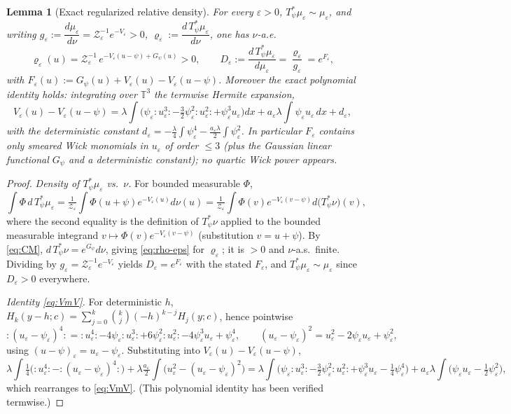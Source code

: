 \documentclass[12pt]{article}
\newcommand{\bT}{\mathbb{T}}
\newcommand{\Wick}[1]{{:}#1{:}}
\newcommand{\eps}{\varepsilon}
\theoremstyle{plain}
\newtheorem{lemma}{Lemma}
\theoremstyle{definition}
\begin{document}
\begin{lemma}[Exact regularized relative density]\label{lem:auto}
For every $\eps>0$, $T_\psi^\ast\mu_\eps\sim\mu_\eps$, and writing
$g_\eps:=\dfrac{d\mu_\eps}{d\nu}=\mathcal Z_\eps^{-1}e^{-V_\eps}>0$,
$\varrho_\eps:=\dfrac{d\,T_\psi^\ast\mu_\eps}{d\nu}$, one has $\nu$-a.e.
\begin{equation}\label{eq:rho-eps}
\varrho_\eps(u)=\mathcal Z_\eps^{-1}\,e^{-V_\eps(u-\psi)+G_\psi(u)}>0,
\qquad
D_\eps:=\frac{d\,T_\psi^\ast\mu_\eps}{d\mu_\eps}=\frac{\varrho_\eps}{g_\eps}
=e^{F_\eps},
\end{equation}
with $F_\eps(u):=G_\psi(u)+V_\eps(u)-V_\eps(u-\psi)$. Moreover the exact polynomial
identity holds: integrating over $\bT^3$ the termwise Hermite expansion,
\begin{equation}\label{eq:VmV}
V_\eps(u)-V_\eps(u-\psi)
=\lambda\!\int\!\Big(\psi_\eps\Wick{u_\eps^3}-\tfrac32\psi_\eps^2\Wick{u_\eps^2}+\psi_\eps^3u_\eps\Big)dx
+a_\eps\lambda\!\int\psi_\eps u_\eps\,dx+d_\eps,
\end{equation}
with the deterministic constant $d_\eps=-\tfrac\lambda4\int\psi_\eps^4-\tfrac{a_\eps\lambda}2\int\psi_\eps^2$.
In particular $F_\eps$ contains only smeared Wick monomials in $u_\eps$ of order $\le3$
(plus the Gaussian linear functional $G_\psi$ and a deterministic constant); no quartic
Wick power appears.
\end{lemma}

\begin{proof}
\emph{Density of $T_\psi^\ast\mu_\eps$ vs.\ $\nu$.} For bounded measurable $\Phi$,
\[
\int\Phi\,d\,T_\psi^\ast\mu_\eps
=\tfrac1{\mathcal Z_\eps}\!\int\Phi(u+\psi)e^{-V_\eps(u)}d\nu(u)
=\tfrac1{\mathcal Z_\eps}\!\int\Phi(v)e^{-V_\eps(v-\psi)}d\big(T_\psi^\ast\nu\big)(v),
\]
where the second equality is the definition of $T_\psi^\ast\nu$ applied to the bounded
measurable integrand $v\mapsto\Phi(v)e^{-V_\eps(v-\psi)}$ (substitution $v=u+\psi$). By
\eqref{eq:CM}, $d\,T_\psi^\ast\nu=e^{G_\psi}d\nu$, giving \eqref{eq:rho-eps} for
$\varrho_\eps$; it is $>0$ and $\nu$-a.s.\ finite. Dividing by
$g_\eps=\mathcal Z_\eps^{-1}e^{-V_\eps}$ yields $D_\eps=e^{F_\eps}$ with the stated
$F_\eps$, and $T_\psi^\ast\mu_\eps\sim\mu_\eps$ since $D_\eps>0$ everywhere.

\emph{Identity \eqref{eq:VmV}.} For deterministic $h$,
$H_k(y-h;c)=\sum_{j=0}^k\binom kj(-h)^{k-j}H_j(y;c)$, hence pointwise
\[
\Wick{(u_\eps-\psi_\eps)^4}=\Wick{u_\eps^4}-4\psi_\eps\Wick{u_\eps^3}+6\psi_\eps^2\Wick{u_\eps^2}-4\psi_\eps^3u_\eps+\psi_\eps^4,
\qquad (u_\eps-\psi_\eps)^2=u_\eps^2-2\psi_\eps u_\eps+\psi_\eps^2,
\]
using $(u-\psi)_\eps=u_\eps-\psi_\eps$. Substituting into $V_\eps(u)-V_\eps(u-\psi)$,
\[
\lambda\!\int\!\tfrac14\big(\Wick{u_\eps^4}-\Wick{(u_\eps-\psi_\eps)^4}\big)
+\lambda\tfrac{a_\eps}2\!\int\big(u_\eps^2-(u_\eps-\psi_\eps)^2\big)
=\lambda\!\int\!\big(\psi_\eps\Wick{u_\eps^3}-\tfrac32\psi_\eps^2\Wick{u_\eps^2}+\psi_\eps^3u_\eps-\tfrac14\psi_\eps^4\big)
+a_\eps\lambda\!\int\!\big(\psi_\eps u_\eps-\tfrac12\psi_\eps^2\big),
\]
which rearranges to \eqref{eq:VmV}. (This polynomial identity has been verified
termwise.)
\end{proof}
\end{document}

